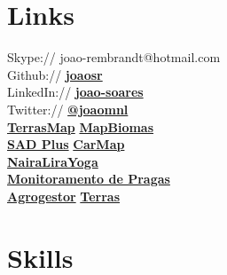 \documentclass[]{joaosoares-resume}
\begin{document}
\begin{minipage}[t]{0.35\textwidth}
\section{Links} 
Skype:// joao-rembrandt@hotmail.com \\
Github:// \href{https://github.com/joaosr}{\bf joaosr} \\
LinkedIn://  \href{https://www.linkedin.com/in/joao-soares}{\bf joao-soares} \\
Twitter://  \href{https://twitter.com/joao_mnl}{\bf @joao\underline{\hspace{.10in}}mnl}\\
\sectionsep
{}
\href{https://goo.gl/6gUzPA}{\bf TerrasMap} \textbullet{}
\href{https://goo.gl/eYX5SW}{\bf MapBiomas} \\
\href{https://goo.gl/2J41hR}{\bf SAD Plus} \textbullet{}
\href{https://goo.gl/fCCp9s}{\bf CarMap}\\
\href{https://goo.gl/wrN029}{\bf NairaLiraYoga}\\
\sectionsep
{}
\href{https://goo.gl/RcdbHk}{\bf Monitoramento de Pragas} \\
\href{https://goo.gl/mycBmL}{\bf Agrogestor} \textbullet{}
\href{https://goo.gl/OyZXke}{\bf Terras}\\
\sectionsep




\section{Skills}


\end{minipage}
\end{document}
